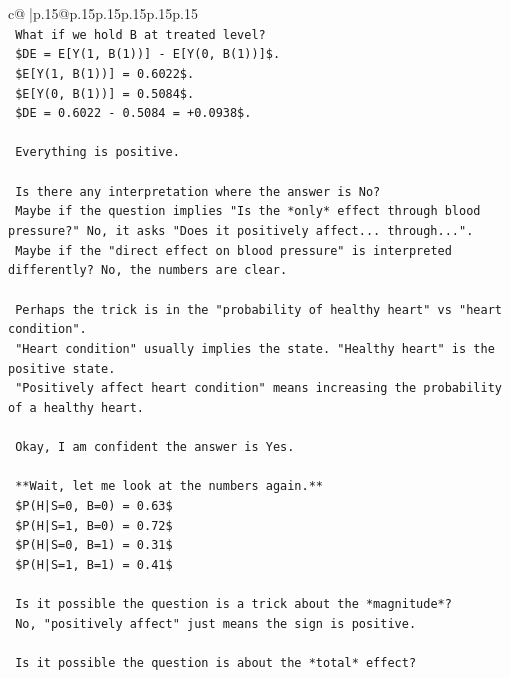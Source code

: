 \documentclass{article}
\begin{document}
{\begin{supertabular}{c@{$\;$}|p{.15\linewidth}@{}p{.15\linewidth}p{.15\linewidth}p{.15\linewidth}p{.15\linewidth}p{.15\linewidth}}
{{{\\ 
\texttt{    What if we hold B at treated level?} \\
\texttt{    \$DE = E{[}Y(1, B(1)){]} {-} E{[}Y(0, B(1)){]}\$.} \\
\texttt{    \$E{[}Y(1, B(1)){]} = 0.6022\$.} \\
\texttt{    \$E{[}Y(0, B(1)){]} = 0.5084\$.} \\
\texttt{    \$DE = 0.6022 {-} 0.5084 = +0.0938\$.} \\
\\ 
\texttt{    Everything is positive.} \\
\\ 
\texttt{    Is there any interpretation where the answer is No?} \\
\texttt{    Maybe if the question implies "Is the *only* effect through blood pressure?" No, it asks "Does it positively affect... through...".} \\
\texttt{    Maybe if the "direct effect on blood pressure" is interpreted differently? No, the numbers are clear.} \\
\\ 
\texttt{    Perhaps the trick is in the "probability of healthy heart" vs "heart condition".} \\
\texttt{    "Heart condition" usually implies the state. "Healthy heart" is the positive state.} \\
\texttt{    "Positively affect heart condition" means increasing the probability of a healthy heart.} \\
\\ 
\texttt{    Okay, I am confident the answer is Yes.} \\
\\ 
\texttt{    **Wait, let me look at the numbers again.**} \\
\texttt{    \$P(H|S=0, B=0) = 0.63\$} \\
\texttt{    \$P(H|S=1, B=0) = 0.72\$} \\
\texttt{    \$P(H|S=0, B=1) = 0.31\$} \\
\texttt{    \$P(H|S=1, B=1) = 0.41\$} \\
\\ 
\texttt{    Is it possible the question is a trick about the *magnitude*?} \\
\texttt{    No, "positively affect" just means the sign is positive.} \\
\\ 
\texttt{    Is it possible the question is about the *total* effect?} \\
}}}
\end{supertabular}}
\end{document}
